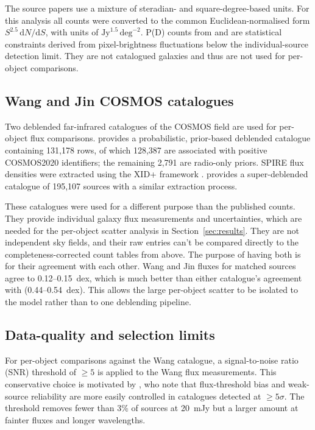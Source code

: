 \documentclass[12pt,a4paper]{article}
\begin{document}
The source papers use a mixture of steradian- and square-degree-based units. For this
analysis all counts were converted to the common Euclidean-normalised form
$S^{2.5}\,\mathrm{d}N/\mathrm{d}S$, with units of
$\mathrm{Jy}^{1.5}\,\mathrm{deg}^{-2}$. P(D) counts from \citet{Glenn_2010} and
\citet{Varnish_2025} are statistical constraints derived from pixel-brightness
fluctuations below the individual-source detection limit. They are not catalogued
galaxies and thus are not used for per-object comparisons.

\subsection{Wang and Jin COSMOS catalogues}
\label{sec:data:catalogues}

Two deblended far-infrared catalogues of the COSMOS field are used for per-object flux
comparisons. \citet{Wang_2024} provides a probabilistic, prior-based deblended catalogue
containing 131,178 rows, of which 128,387 are associated with positive COSMOS2020
identifiers; the remaining 2,791 are radio-only priors. SPIRE flux densities were
extracted using the XID+ framework \citep{Hurley_2017}. \citet{Jin_2018} provides a
super-deblended catalogue of 195,107 sources with a similar extraction process.

These catalogues were used for a different purpose than the published counts. They provide
individual galaxy flux measurements and uncertainties, which are needed for the
per-object scatter analysis in Section~\ref{sec:results}. They are not
independent sky fields, and their raw entries can't be compared directly to the completeness-corrected count tables from above. The purpose of having both is for their
agreement with each other. Wang and Jin fluxes for matched sources agree to
0.12--\SI{0.15}{dex}, which is much better than either catalogue's agreement with
\popcosmos{} (0.44--\SI{0.54}{dex}). This allows the large per-object scatter to be isolated to
the model rather than to one deblending pipeline.

\subsection{Data-quality and selection limits}
\label{sec:data:quality}

For per-object comparisons against the Wang catalogue, a signal-to-noise ratio (SNR)
threshold of $\geq 5$ is applied to the Wang flux measurements. This conservative choice
is motivated by \citet{Clements_1999}, who note that flux-threshold bias and weak-source reliability are
more easily controlled in catalogues detected at $\geq 5\sigma$.
The threshold removes fewer than 3\% of sources at \SI{20}{mJy} but a larger amount
at fainter fluxes and longer wavelengths.
\end{document}
